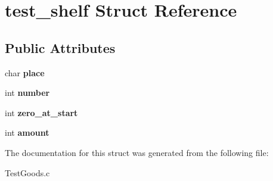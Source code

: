 \hypertarget{structtest__shelf}{}\section{test\+\_\+shelf Struct Reference}
\label{structtest__shelf}
\subsection*{Public Attributes}
\begin{DoxyCompactItemize}
\item 
\hypertarget{structtest__shelf_a90d291a57157301c596bb5d284851e1c}{}char {\bfseries place}\label{structtest__shelf_a90d291a57157301c596bb5d284851e1c}

\item 
\hypertarget{structtest__shelf_adc546dfafd0b69e781c595d673de0165}{}int {\bfseries number}\label{structtest__shelf_adc546dfafd0b69e781c595d673de0165}

\item 
\hypertarget{structtest__shelf_aedad563d75635e8a3cd4f2273c16260d}{}int {\bfseries zero\+\_\+at\+\_\+start}\label{structtest__shelf_aedad563d75635e8a3cd4f2273c16260d}

\item 
\hypertarget{structtest__shelf_a7f02c6ef4593657b3a94294e790a0eee}{}int {\bfseries amount}\label{structtest__shelf_a7f02c6ef4593657b3a94294e790a0eee}

\end{DoxyCompactItemize}


The documentation for this struct was generated from the following file\+:\begin{DoxyCompactItemize}
\item 
Test\+Goods.\+c\end{DoxyCompactItemize}
